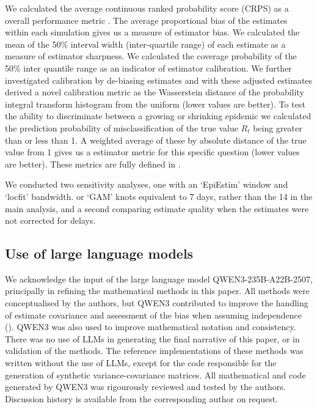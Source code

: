 \documentclass[10pt,letterpaper]{article}
\begin{document}
We calculated the average continuous ranked probability score (CRPS) as a overall performance metric \cite{anderson1996,bosse2024,bosse2023,brocker2008,gneiting2007}. The average proportional bias of the estimates within each simulation gives us a measure of estimator bias. We calculated the mean of the 50\% interval width (inter-quartile range) of each estimate as a measure of estimator sharpness. We calculated the coverage probability of the 50\% inter quantile range as an indicator of estimator calibration. We further investigated calibration by de-biasing estimates and with these adjusted estimates derived a novel calibration metric as the Wasserstein distance \cite{panaretos2019} of the probability integral transform histogram from the uniform \cite{david1948,hamill2001,wilks2019,brockwell2007} (lower values are better). To test the ability to discriminate between a growing or shrinking epidemic we calculated the prediction probability of misclassification of the true value $R_t$ being greater than or less than 1. A weighted average of these by absolute distance of the true value from 1 gives us a estimator metric for this specific question (lower values are better). These metrics are fully defined in .

We conducted two sensitivity analyses, one with an `EpiEstim' window and `locfit' bandwidth. or `GAM' knots equivalent to 7 days, rather than the 14 in the main analysis, and a second comparing estimate quality when the estimates were not corrected for delays.

\subsection*{Use of large language models}

We acknowledge the input of the large language model QWEN3-235B-A22B-2507, principally in refining the mathematical methods in this paper. All methods were conceptualised by the authors, but QWEN3 contributed to improve the handling of estimate covariance and assessment of the bias when assuming independence (). QWEN3 was also used to improve mathematical notation and consistency. There was no use of LLMs in generating the final narrative of this paper, or in validation of the methods. The reference implementations of these methods was written without the use of LLMs, except for the code responsible for the generation of synthetic variance-covariance matrices. All mathematical and code generated by QWEN3 was rigourously reviewed and tested by the authors. Discussion history is available from the corresponding author on request.
\end{document}
